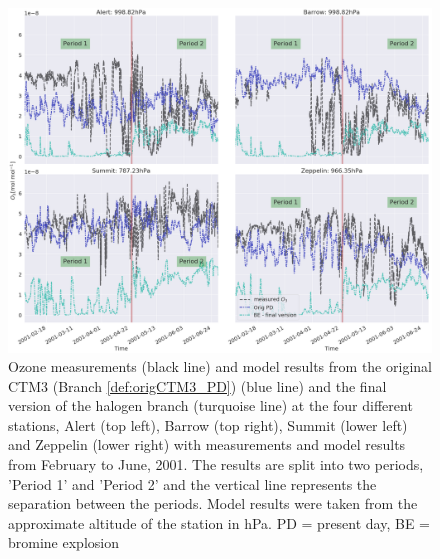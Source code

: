 \begin{figure}[h]
    \centering
    \includegraphics[width = \linewidth]{Chapter6_Results/images/ozone_stationComp_2001/ozone_2001_2periods_step5.png}
    \caption{Ozone measurements (black line) and model results from the original CTM3 (Branch \ref{def:origCTM3_PD}) (blue line) and the final version of the halogen branch (turquoise line) at the four different stations, Alert (top left), Barrow (top right), Summit (lower left) and Zeppelin (lower right) with measurements and model results from February to June, 2001. The results are split into two periods, 'Period 1' and 'Period 2' and the vertical line represents the separation between the periods. Model results were taken from the approximate altitude of the station in hPa. PD = present day, BE = bromine explosion}
    \label{fig:2p_step5}
\end{figure}